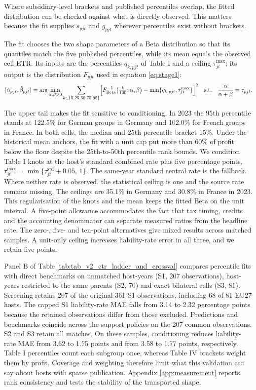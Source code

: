 \documentclass[11pt,a4paper]{article}
\begin{document}
Where subsidiary-level brackets and published percentiles overlap, the fitted distribution can be checked against what is directly observed. This matters because the fit supplies $s_{pjt}$ and $\bar g_{pjt}$ wherever percentiles exist without brackets.

The fit chooses the two shape parameters of a Beta distribution so that its quantiles match the five published percentiles, while its mean equals the observed cell ETR. Its inputs are the percentiles $q_{k,pjt}$ of Table I and a ceiling $\bar\tau^{\max}_{jt}$; its output is the distribution $F_{pjt}$ used in equation \eqref{eq:stage1}:
\begin{equation}\label{eq:betafit}
(\hat\alpha_{pjt},\hat\beta_{pjt})=\arg\min_{\alpha,\beta>0}\sum_{k\in\{5,25,50,75,95\}}\Bigl[F^{-1}_{\mathrm{Beta}}\bigl(\tfrac{k}{100};\alpha,\beta\bigr)-\min\{q_{k,pjt},\bar\tau^{\max}_{jt}\}\Bigr]^2
\quad\text{s.t.}\quad \frac{\alpha}{\alpha+\beta}=\tau_{pjt}.
\end{equation}

The upper tail makes the fit sensitive to conditioning. In 2023 the 95th percentile stands at 122.5\% for German groups in Germany and 102.0\% for French groups in France. In both cells, the median and 25th percentile bracket 15\%. Under the historical mean anchors, the fit with a unit cap put more than 60\% of profit below the floor despite the 25th-to-50th percentile rank bounds. We condition Table I knots at the host's standard combined rate plus five percentage points, $\bar\tau^{\max}_{jt}=\min\{\tau^{\mathrm{std}}_{jt}+0.05,\,1\}$. The same-year standard central rate is the fallback. Where neither rate is observed, the statistical ceiling is one and the source rate remains missing. The ceilings are 35.1\% in Germany and 30.8\% in France in 2023. This regularisation of the knots and the mean keeps the fitted Beta on the unit interval. A five-point allowance accommodates the fact that tax timing, credits and the accounting denominator can separate measured ratios from the headline rate. The zero-, five- and ten-point alternatives give mixed results across matched samples. A unit-only ceiling increases liability-rate error in all three, and we retain five points.

Panel B of Table \ref{tab:tab_v2_etr_ladder_and_crossval} compares percentile fits with direct benchmarks on unmatched host-years (S1, 207 observations), host-years restricted to the same parents (S2, 70) and exact bilateral cells (S3, 81). Screening retains 207 of the original 361 S1 observations, including 68 of 81 EU27 hosts. The capped S1 liability-rate MAE falls from 3.14 to 2.32 percentage points because the retained observations differ from those excluded. Predictions and benchmarks coincide across the support policies on the 207 common observations. S2 and S3 retain all matches. On these samples, conditioning reduces liability-rate MAE from 3.62 to 1.75 points and from 3.58 to 1.77 points, respectively. Table I percentiles count each subgroup once, whereas Table IV brackets weight them by profit. Coverage and weighting therefore limit what this validation can say about hosts with sparse publication. Appendix \ref{app:measurement} reports rank consistency and tests the stability of the transported shape.
\end{document}
